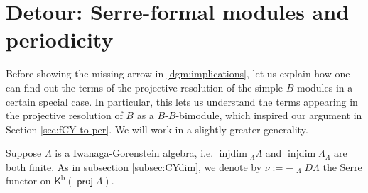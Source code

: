\documentclass[a4paper,reqno,11pt]{amsart}
\newtheorem{question}[theorem]{Question}
\theoremstyle{definition}
\newcommand{\KKK}{\mathsf{K}}
\newcommand{\TT}{\mathcal{T}}
\newcommand{\Hom}{\operatorname{Hom}\nolimits}
\newcommand{\injdim}{\operatorname{injdim}\nolimits}
\newcommand{\Lotimes}{\mathop{\stackrel{\mathbf{L}}{\otimes}}\nolimits}
\DeclareMathOperator{\proj}{\mathsf{proj}}
\newcommand{\Kb}{\KKK^{\mathrm{b}}}
\numberwithin{equation}{section}
\begin{document}



\section{Detour: Serre-formal modules and periodicity}


Before showing the missing arrow in \eqref{dgm:implications}, let us explain how one can find out the terms of the projective resolution of the simple $B$-modules in a certain special case.  In particular, this lets us understand the terms appearing in the projective resolution of $B$ as a $B$-$B$-bimodule, which inspired our argument in Section \ref{sec:fCY to per}.  We will work in a slightly greater generality.

Suppose $\Lambda$ is a Iwanaga-Gorenstein algebra, i.e. $\injdim {}_{\Lambda}\Lambda$ and $\injdim \Lambda_\Lambda$ are both finite.
As in subsection \ref{subsec:CYdim}, we denote by $\nu:=-\Lotimes_\Lambda D\Lambda$ the Serre functor on $\Kb(\proj\Lambda)$.
\end{document}
